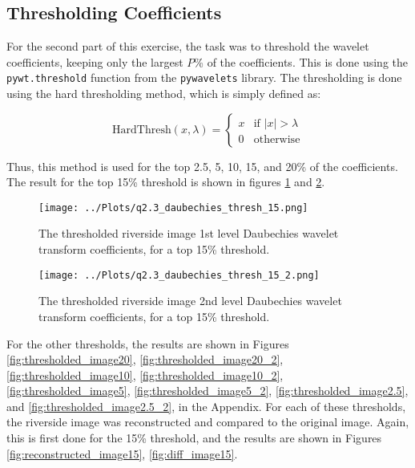 \documentclass[12pt]{report} %
\begin{document}
\subsection{Thresholding Coefficients}

For the second part of this exercise, the task was to threshold the wavelet coefficients, keeping only the largest $P$\% of the coefficients. This is done using the \texttt{pywt.threshold} function from the \texttt{pywavelets} library. The thresholding is done using the hard thresholding method, which is simply defined as:

\begin{equation}
    \text{HardThresh}(x, \lambda) =
    \begin{cases}
        x & \text{if } |x| > \lambda \\
        0 & \text{otherwise}
    \end{cases}
\end{equation}

Thus, this method is used for the top 2.5, 5, 10, 15, and 20\% of the coefficients. The result for the top 15\% threshold is shown in figures \ref{fig:thresholded_image15} and \ref{fig:thresholded_image15_2}.

\begin{figure}[htbp]
    \centering
    \texttt{[image: ../Plots/q2.3\_daubechies\_thresh\_15.png]}
    \caption{The thresholded riverside image 1st level Daubechies wavelet transform coefficients, for a top 15\% threshold.}
    \label{fig:thresholded_image15}
\end{figure}

\begin{figure}[htbp]
    \centering
    \texttt{[image: ../Plots/q2.3\_daubechies\_thresh\_15\_2.png]}
    \caption{The thresholded riverside image 2nd level Daubechies wavelet transform coefficients, for a top 15\% threshold.}
    \label{fig:thresholded_image15_2}
\end{figure}

For the other thresholds, the results are shown in Figures \ref{fig:thresholded_image20}, \ref{fig:thresholded_image20_2}, \ref{fig:thresholded_image10}, \ref{fig:thresholded_image10_2}, \ref{fig:thresholded_image5}, \ref{fig:thresholded_image5_2}, \ref{fig:thresholded_image2.5}, and \ref{fig:thresholded_image2.5_2}, in the Appendix. For each of these thresholds, the riverside image was reconstructed and compared to the original image. Again, this is first done for the 15\% threshold, and the results are shown in Figures \ref{fig:reconstructed_image15}, \ref{fig:diff_image15}.
\end{document}
